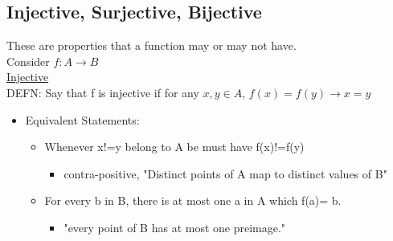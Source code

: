 \documentclass{article}
\begin{document}
\subsection{Injective, Surjective, Bijective}
These are properties that a function may or may not have.\\
Consider $f: A \rightarrow B$\\

\underline{Injective}\\

DEFN: Say that f is injective if for any $x,y \in A$, $f(x)=f(y) \rightarrow x=y$\\
\begin{itemize}
\item Equivalent Statements:
\begin{itemize}
\item Whenever x!=y belong to A be must have f(x)!=f(y)
\begin{itemize}
\item contra-positive, "Distinct points of A map to distinct values of B"
\end{itemize}
\item For every b in B, there is at most one a in A which f(a)= b.
\begin{itemize}
\item "every point of B has at most one preimage."
\end{itemize}
\end{itemize}
\end{itemize}









\end{document}
